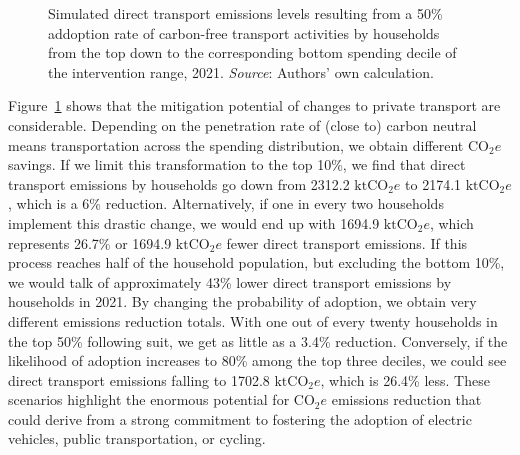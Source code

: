 \documentclass[
  10pt,
  twocolumn]{aft}
\begin{document}
\begin{figure}


\caption{\label{fig-cf-coicopCO2b}Simulated direct transport emissions
levels resulting from a 50\% addoption rate of carbon-free transport
activities by households from the top down to the corresponding bottom
spending decile of the intervention range, 2021. \emph{Source}: Authors'
own calculation.}

\end{figure}%

Figure~\ref{fig-cf-coicopCO2b} shows that the mitigation potential of
changes to private transport are considerable. Depending on the
penetration rate of (close to) carbon neutral means transportation
across the spending distribution, we obtain different \(\text{CO}_2e\)
savings. If we limit this transformation to the top 10\%, we find that
direct transport emissions by households go down from 2312.2
\(\text{ktCO}_2e\) to 2174.1 \(\text{ktCO}_2e\), which is a 6\%
reduction. Alternatively, if one in every two households implement this
drastic change, we would end up with 1694.9 \(\text{ktCO}_2e\), which
represents 26.7\% or 1694.9 \(\text{ktCO}_2e\) fewer direct transport
emissions. If this process reaches half of the household population, but
excluding the bottom 10\%, we would talk of approximately 43\% lower
direct transport emissions by households in 2021. By changing the
probability of adoption, we obtain very different emissions reduction
totals. With one out of every twenty households in the top 50\%
following suit, we get as little as a 3.4\% reduction. Conversely, if
the likelihood of adoption increases to 80\% among the top three
deciles, we could see direct transport emissions falling to 1702.8
\(\text{ktCO}_2e\), which is 26.4\% less. These scenarios highlight the
enormous potential for \(\text{CO}_2e\) emissions reduction that could
derive from a strong commitment to fostering the adoption of electric
vehicles, public transportation, or cycling.
\end{document}
